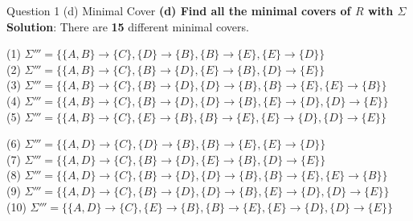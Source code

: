 \begin{frame}[fragile]{Question 1 (d) Minimal Cover}
	\textbf{(d) Find all the minimal covers of $R$ with $\Sigma$}\\ \vspace{5pt}
	\textbf{Solution}: There are \textbf{15} different minimal covers.\\\vspace{2pt}
	{\footnotesize
	(1)  $\Sigma'''=\{\{A, B\} \rightarrow \{C\}, \{D\} \rightarrow \{B\}, \{B\} \rightarrow \{E\}, \{E\} \rightarrow \{D\}\}$ \\\vspace{2pt}
	(2)  $\Sigma'''=\{\{A, B\} \rightarrow \{C\}, \{B\} \rightarrow \{D\}, \{E\} \rightarrow \{B\}, \{D\} \rightarrow \{E\}\}$ \\\vspace{2pt}
	(3)  $\Sigma'''=\{\{A, B\} \rightarrow \{C\}, \{B\} \rightarrow \{D\}, \{D\} \rightarrow \{B\}, \{B\} \rightarrow \{E\}, \{E\} \rightarrow \{B\}\}$ \\\vspace{2pt}
	(4)  $\Sigma'''=\{\{A, B\} \rightarrow \{C\}, \{B\} \rightarrow \{D\}, \{D\} \rightarrow \{B\}, \{E\} \rightarrow \{D\}, \{D\} \rightarrow \{E\}\}$ \\\vspace{2pt}
	(5)  $\Sigma'''=\{\{A, B\} \rightarrow \{C\}, \{E\} \rightarrow \{B\}, \{B\} \rightarrow \{E\}, \{E\} \rightarrow \{D\}, \{D\} \rightarrow \{E\}\}$ \\\vspace{2pt}
	
	(6)  $\Sigma'''=\{\{A, D\} \rightarrow \{C\}, \{D\} \rightarrow \{B\}, \{B\} \rightarrow \{E\}, \{E\} \rightarrow \{D\}\}$ \\\vspace{2pt}
	(7)  $\Sigma'''=\{\{A, D\} \rightarrow \{C\}, \{B\} \rightarrow \{D\}, \{E\} \rightarrow \{B\}, \{D\} \rightarrow \{E\}\}$ \\\vspace{2pt}
	(8)  $\Sigma'''=\{\{A, D\} \rightarrow \{C\}, \{B\} \rightarrow \{D\}, \{D\} \rightarrow \{B\}, \{B\} \rightarrow \{E\}, \{E\} \rightarrow \{B\}\}$ \\\vspace{2pt}
	(9)  $\Sigma'''=\{\{A, D\} \rightarrow \{C\}, \{B\} \rightarrow \{D\}, \{D\} \rightarrow \{B\}, \{E\} \rightarrow \{D\}, \{D\} \rightarrow \{E\}\}$ \\\vspace{2pt}
	(10) $\Sigma'''=\{\{A, D\} \rightarrow \{C\}, \{E\} \rightarrow \{B\}, \{B\} \rightarrow \{E\}, \{E\} \rightarrow \{D\}, \{D\} \rightarrow \{E\}\}$ \\\vspace{2pt}
	
}
\end{frame}
